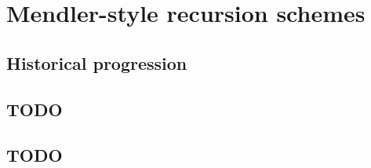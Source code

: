 \chapter{Mendler-style recursion schemes}\label{ch:mendler}

\section{Historical progression}

\section{TODO}

\section{TODO}

